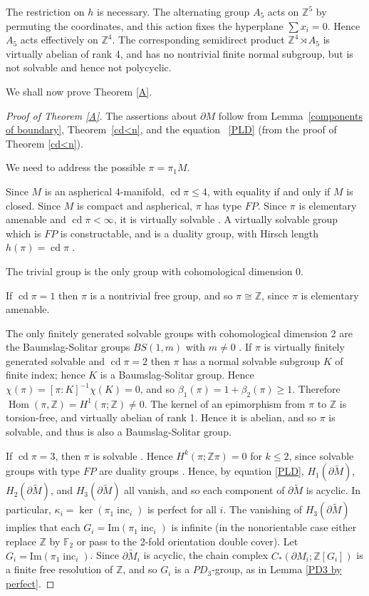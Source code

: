 \documentclass[12pt]{amsart}
\renewcommand{\geq}{\geqslant}
\renewcommand{\leq}{\leqslant}
\theoremstyle{definition}
\newcommand{\F}{\mathbb F}
\newcommand{\Z}{\mathbb Z}
\DeclareMathOperator{\cd}{cd}
\DeclareMathOperator{\Hom}{Hom}
\DeclareMathOperator{\inc}{inc}
\newcommand{\wt}[1]{{\widetilde{#1}}}
\begin{document}
The restriction on $h$ is necessary.
The alternating group $A_5$ acts on $\mathbb{Z}^5$ by permuting the coordinates,
and this action fixes the hyperplane $\sum {x_i}=0$. 
Hence $A_5$ acts effectively on $\mathbb{Z}^4$.
The corresponding semidirect product $\mathbb{Z}^4\rtimes{A_5}$ 
is virtually abelian of rank 4, and has no nontrivial finite normal subgroup,
but is not solvable and hence not polycyclic.

We shall now prove  Theorem \ref{A}.

\begin{proof}[Proof of Theorem \ref{A}]
The assertions about $\partial M$  follow from Lemma~\ref{components of boundary}, 
Theorem~\ref{cd<n}, and the equation ~\eqref{PLD} (from the proof of Theorem \ref{cd<n}).

We need to address the possible $\pi = \pi_1M$.

Since $M$ is an aspherical 4-manifold, $\cd\pi\leq4$, 
with equality if and only if $M$ is closed.   Since $M$ is compact and aspherical, $\pi$ has type $FP$.
Since $\pi$ is elementary amenable and $\cd\pi<\infty$,
it is virtually solvable \cite{HL92}.
A virtually solvable group which is $FP$ is constructable,
and is a duality group, with Hirsch length $h(\pi)=\cd\pi$ \cite{Kr86}.

The trivial group is the only group with cohomological dimension 0.
 
If $\cd\pi=1$ then $\pi$ is a nontrivial free group,  and so $\pi\cong\Z$,
since $\pi$ is elementary amenable.

The only finitely generated solvable groups with cohomological dimension 2 
are the Baumslag-Solitar groups $BS(1,m)$ with $m\not=0$ \cite{Gi79}.
If $\pi$ is virtually finitely generated solvable and $\cd\pi=2$ then $\pi$ has
a normal solvable subgroup $K$ of finite index;  
hence $K$ is a Baumslag-Solitar group.
Hence $\chi(\pi)=[\pi:K]^{-1}\chi(K)=0$, 
and so $\beta_1(\pi)=1+\beta_2(\pi)\geq1$.
Therefore $\Hom(\pi,\Z)=H^1(\pi;\Z)\not=0$.
The kernel of an epimorphism from $\pi$ to $\Z$ is torsion-free,
and virtually abelian of rank 1.
Hence it is abelian, and so $\pi$ is solvable,
and thus is also a Baumslag-Solitar group.   

If $\cd\pi=3$, then $\pi$ is solvable \cite{Hi24}.
Hence $H^k(\pi;\Z\pi)=0$ for $k\leq2$,
since solvable groups with type $FP$ are duality groups \cite{Kr86}.
Hence, by equation \eqref{PLD}, 
$H_1(\partial \wt M)$, $H_2(\partial \wt M)$, 
and $H_3(\partial \wt M)$ all vanish,
and so each component of $\partial \wt M$ is acyclic. 
In particular,  $\kappa_i=\ker(\pi_1\inc_i)$ is perfect for all $i$.   
The vanishing of $H_3(\partial \wt M)$ implies that each  
$G_i=\mathrm{Im}(\pi_1\inc_i)$ is infinite (in the nonorientable case 
either replace $\Z$ by $\F_2$ or pass to the 2-fold orientation double cover).   
Let $G_i=\mathrm{Im}(\pi_1\inc_i)$.
Since $\partial \wt{M}_i$ is acyclic, 
the chain complex $C_*(\partial{M}_i;\mathbb{Z}[G_i])$ 
is a finite free resolution of $\mathbb{Z}$, and so $G_i$ is a $PD_3$-group, 
as in Lemma \ref{PD3 by perfect}.


\end{proof}
\end{document}

